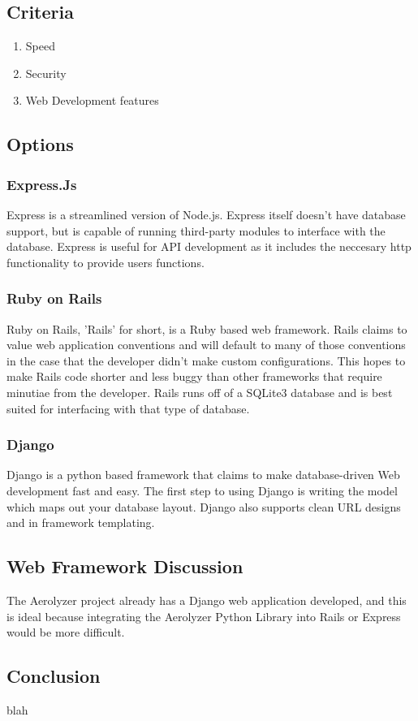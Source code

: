 \documentclass[onecolumn, draftclsnofoot,10pt, compsoc]{IEEEtran}
\begin{document}
\begin{singlespace}
\subsection{Criteria}
\begin{enumerate}
\item Speed
\item Security
\item Web Development features
\end{enumerate}
\subsection{Options}
\subsubsection{Express.Js}
Express is a streamlined version of Node.js.
Express itself doesn't have database support, but is capable of running third-party modules to interface with the database.
Express is useful for API development as it includes the neccesary http functionality to provide users functions.
\subsubsection{Ruby on Rails}
 Ruby on Rails, 'Rails' for short, is a Ruby based web framework.
Rails claims to value web application conventions and will default to many of those conventions in the case that the developer didn't make custom configurations.
This hopes to make Rails code shorter and less buggy than other frameworks that require minutiae from the developer.
Rails runs off of a SQLite3 database and is best suited for interfacing with that type of database.
\subsubsection{Django}
Django is a python based framework that claims to make database-driven Web development fast and easy.
The first step to using Django is writing the model which maps out your database layout.
Django also supports clean URL designs and in framework templating.
\subsection{Web Framework Discussion}
The Aerolyzer project already has a Django web application developed, and this is ideal because integrating the Aerolyzer Python Library into Rails or Express would be more difficult. 
\subsection{Conclusion}
blah



\end{singlespace}
\end{document}
